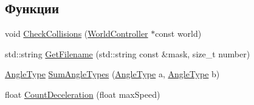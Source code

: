 \subsection*{Функции}
\begin{DoxyCompactItemize}
\item 
void \hyperlink{namespacertm_a1fe2c356e3297343804842a57ce23a4b}{Check\+Collisions} (\hyperlink{classrtm_1_1_world_controller}{World\+Controller} $\ast$const world)
\item 
std\+::string \hyperlink{namespacertm_a67bf20fe33d85bc05547ff1849aeb29e}{Get\+Filename} (std\+::string const \&mask, size\+\_\+t number)
\item 
\hyperlink{namespacertm_a69dc82b16a0148c10962caa83d930f89}{Angle\+Type} \hyperlink{namespacertm_ac1ea2821fc44943e5c35d92e0c9cd5de}{Sum\+Angle\+Types} (\hyperlink{namespacertm_a69dc82b16a0148c10962caa83d930f89}{Angle\+Type} a, \hyperlink{namespacertm_a69dc82b16a0148c10962caa83d930f89}{Angle\+Type} b)
\item 
float \hyperlink{namespacertm_a37715773d85c66ba5c1bf11260836fd0}{Count\+Deceleration} (float max\+Speed)
\end{DoxyCompactItemize}
